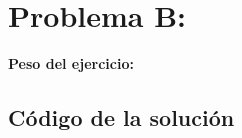 \newpage{}
\section{Problema B:  }
\textbf{Peso del ejercicio: }


\newpage
\subsection{Código de la solución}
\lstset{inputencoding=utf8/latin1}
%
